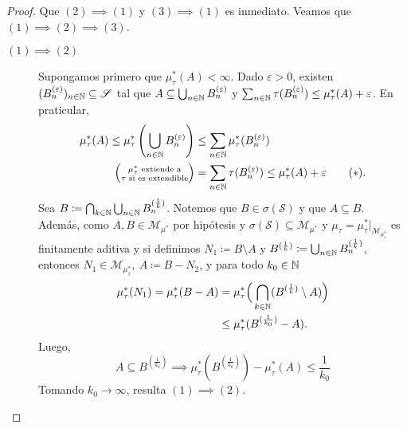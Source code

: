\begin{proof}
	Que $(2) \implies (1)$ y $(3) \implies (1)$ es inmediato. Veamos que $(1) \implies (2) \implies (3)$. \par
	\medskip
	\begin{description}
		\item[$\boxed{(1) \implies (2)}$] Supongamos primero que $\mu^{*}_{\tau}(A) < \infty$. Dado $\varepsilon > 0$, existen $(B^{(\varepsilon{})}_{n})_{n\in\mathbb{N}} \subseteq \mathscr{S}$ tal que $A \subseteq \bigcup_{n\in\mathbb{N}} B^{(\varepsilon{})}_{n}$ y $\sum_{n\in\mathbb{N}}\tau(B^{(\varepsilon)}_{n}) \leq \mu^{*}_{\tau}(A) + \varepsilon{}$. En praticular,
	\begin{align*}
		\mu^{*}_{\tau}(A) \leq \mu^{*}_{\tau}\left( \bigcup_{n\in\mathbb{N}} B^{(\varepsilon)}_{n} \right) & \leq \sum_{n\in\mathbb{N}} \mu^{*}_{\tau}(B^{(\varepsilon)}_{n}) \\
		\Big( \substack{\mu^{*}_{\tau} \text{ extiende a} \\
			\tau \text{ si es extendible}} \Big) &= \sum_{n\in\mathbb{N}} \tau(B^{(\varepsilon{})}_{n}) \leq \mu^{*}_{\tau}(A) + \varepsilon{} \tag{$*$}
	.\end{align*}
	Sea $B \coloneq \bigcap_{k\in\mathbb{N}} \bigcup_{n\in\mathbb{N}} B^{(\frac{1}{k})}_{n}$. Notemos que $B \in \sigma(\mathscr{S})$ y que $A \subseteq B$. Además, como $A,B \in \mathscr{M}_{\mu^{*}}$ por hipótesis y $\sigma(\mathscr{S}) \subseteq \mathscr{M}_{\mu^{*}}$ y $\mu_{\tau} = \mu^{*}_{\tau}\big|_{\mathscr{M}_{\mu^{*}_{\tau}}}$ es finitamente aditiva y si definimos $N_{1} \coloneq B \setminus A$ y $B^{(\frac{1}{k})} \coloneq \bigcup_{n\in\mathbb{N}}B^{(\frac{1}{k})}_{n}$, entonces $N_{1} \in \mathscr{M}_{\mu^{*}_{\tau}},\ A \coloneq B - N_{2}$, y para todo $k_{0} \in \mathbb{N}$
	\begin{align*}
		\mu^{*}_{\tau}(N_{1}) = \mu^{*}_{\tau}(B - A) &= \mu^{*}_{\tau} \Big( \bigcap_{k\in\mathbb{N}} (B^{(\frac{1}{k})} \setminus A) \Big) \\
		& \leq \mu^{*}_{\tau}(B^{(\frac{1}{k_{0}})}-A)
	.\end{align*}
	Luego,
	\[ A \subseteq B^{(\frac{1}{k_{0}})} \implies \mu^{*}_{\tau}(B^{(\frac{1}{k_{0}})}) - \mu^{*}_{\tau}(A) \leq \frac{1}{k_{0}} \tag{$*$} \]
	Tomando $k_{0} \longrightarrow{} \infty$, resulta $(1) \implies (2)$.
	\end{description}
\end{proof}
